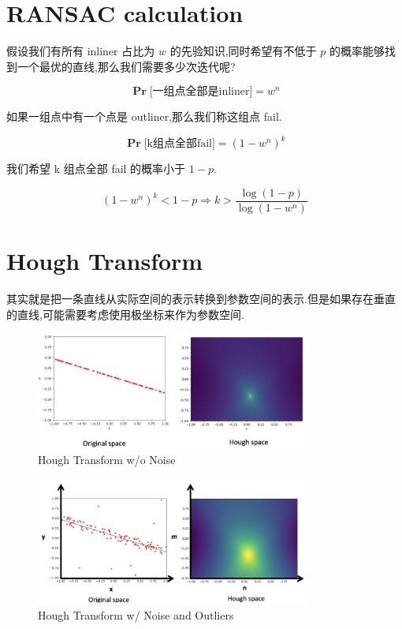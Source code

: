 \documentclass[lang=cn,10pt,green]{elegantbook}
\begin{document}
\section{RANSAC calculation}

假设我们有所有 inliner 占比为 $w$ 的先验知识,同时希望有不低于 $p$ 的概率能够找到一个最优的直线,那么我们需要多少次迭代呢?

\begin{equation}
\mathbf{\Pr}\text{[一组点全部是inliner]} = w^n
\end{equation}

如果一组点中有一个点是 outliner,那么我们称这组点 fail.

\begin{equation}
\mathbf{\Pr}\text{[k组点全部fail]} = {(1-w^n)}^k
\end{equation}

我们希望 k 组点全部 fail 的概率小于 $1-p$.

\begin{equation}
{(1-w^{n})}^k < 1-p
\Rightarrow
k > \frac{\log(1-p)}{\log(1-w^n)}
\end{equation}

\section{Hough Transform}

其实就是把一条直线从实际空间的表示转换到参数空间的表示.但是如果存在垂直的直线,可能需要考虑使用极坐标来作为参数空间.

\begin{figure}[htbp]
    \centering
    \includegraphics[width=0.8\textwidth]{figures/hough1.png}
    \caption{Hough Transform w/o Noise}
\end{figure}

\begin{figure}[htbp]
    \centering
    \includegraphics[width=0.8\textwidth]{figures/hough2.png}
    \caption{Hough Transform w/ Noise and Outliers}
\end{figure}


\printbibliography[heading=bibintoc, title=\ebibname]
\end{document}
